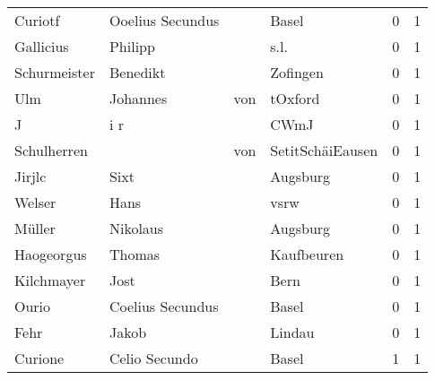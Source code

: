 \begin{center}
\begin{tiny}
\begin{longtabu}{llllrr}
                  Curiotf &                   Ooelius Secundus &             &                                       Basel &          0 &         1 \\
                Gallicius &                            Philipp &             &                                        s.l. &          0 &         1 \\
             Schurmeister &                           Benedikt &             &                                    Zofingen &          0 &         1 \\
                      Ulm &                           Johannes &         von &                                     tOxford &          0 &         1 \\
                        J &                                i r &             &                                        CWmJ &          0 &         1 \\
              Schulherren &                                    &         von &                            SetitSchäiEausen &          0 &         1 \\
                   Jirjlc &                               Sixt &             &                                    Augsburg &          0 &         1 \\
                   Welser &                               Hans &             &                                        vsrw &          0 &         1 \\
                   Müller &                           Nikolaus &             &                                    Augsburg &          0 &         1 \\
               Haogeorgus &                             Thomas &             &                                  Kaufbeuren &          0 &         1 \\
               Kilchmayer &                               Jost &             &                                        Bern &          0 &         1 \\
                    Ourio &                   Coelius Secundus &             &                                       Basel &          0 &         1 \\
                     Fehr &                              Jakob &             &                                      Lindau &          0 &         1 \\
                  Curione &                      Celio Secundo &             &                                       Basel &          1 &         1 \\

\end{longtabu}
\end{tiny}
\end{center}
